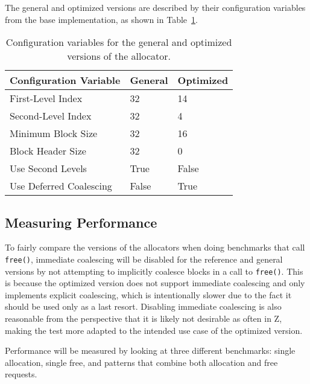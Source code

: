 \newpage

The general and optimized versions are described by their configuration variables from the base implementation, as shown in Table~\ref{table:configuration-variables}.

\begin{table}[H]
    \centering
    \begin{tabular}{lp{2cm}p{6.9cm}}
    \textbf{{Configuration Variable}} & \textbf{{General}} & \textbf{{Optimized}} \\ \hline
    First-Level Index         & 32       & 14     \\ \hline
    Second-Level Index        & 32       & 4      \\ \hline
    Minimum Block Size        & 32       & 16     \\ \hline
    Block Header Size         & 32       & 0      \\ \hline
    Use Second Levels         & True     & False  \\ \hline
    Use Deferred Coalescing   & False    & True
    \end{tabular}
    \caption{Configuration variables for the general and optimized versions of the allocator.}
    \label{table:configuration-variables}
\end{table}

\subsection{Measuring Performance}

To fairly compare the versions of the allocators when doing benchmarks that call \texttt{free()}, immediate coalescing will be disabled for the reference and general versions by not attempting to implicitly coalesce blocks in a call to \texttt{free()}. This is because the optimized version does not support immediate coalescing and only implements explicit coalescing, which is intentionally slower due to the fact it should be used only as a last resort. Disabling immediate coalescing is also reasonable from the perspective that it is likely not desirable as often in Z, making the test more adapted to the intended use case of the optimized version.

Performance will be measured by looking at three different benchmarks: single allocation, single free, and patterns that combine both allocation and free requests.

